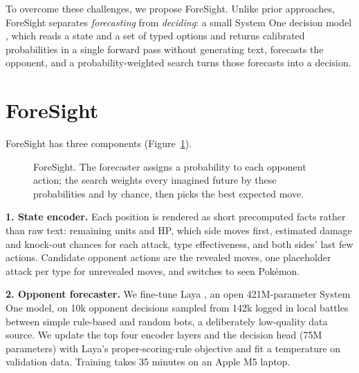 \documentclass[letterpaper]{article} %
\begin{document}
To overcome these challenges, we propose ForeSight. Unlike prior approaches, ForeSight separates \emph{forecasting} from \emph{deciding}: a small System One decision model \citep{jev,laya}, which reads a state and a set of typed options and returns calibrated probabilities in a single forward pass without generating text, forecasts the opponent, and a probability-weighted search turns those forecasts into a decision.

\section{ForeSight}
ForeSight has three components (Figure~\ref{fig:overview}).

\begin{figure}[t]
\centering
{}
\caption{ForeSight. The forecaster assigns a probability to each opponent action; the search weights every imagined future by these probabilities and by chance, then picks the best expected move.}
\label{fig:overview}
\end{figure}

\textbf{1. State encoder.} Each position is rendered as short precomputed facts rather than raw text: remaining units and HP, which side moves first, estimated damage and knock-out chances for each attack, type effectiveness, and both sides' last few actions. Candidate opponent actions are the revealed moves, one placeholder attack per type for unrevealed moves, and switches to seen Pok\'emon.

\textbf{2. Opponent forecaster.} We fine-tune Laya \citep{laya}, an open 421M-parameter System One model, on 10k opponent decisions sampled from 142k logged in local battles between simple rule-based and random bots, a deliberately low-quality data source. We update the top four encoder layers and the decision head (75M parameters) with Laya's proper-scoring-rule objective and fit a temperature on validation data. Training takes 35 minutes on an Apple M5 laptop.
\end{document}
